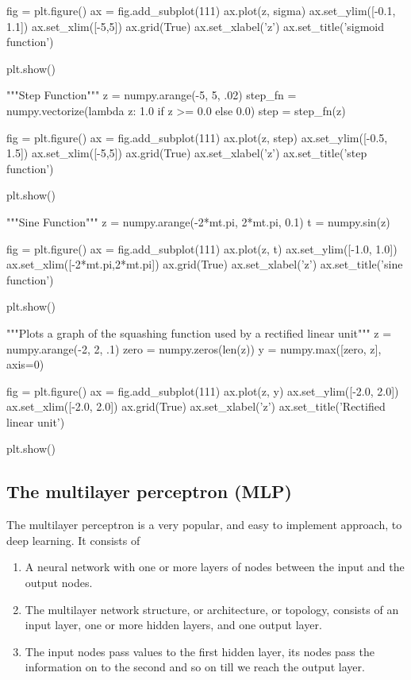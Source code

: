 \documentclass[%
oneside,                 %
final,                   %
10pt]{article}
\begin{document}
fig = plt.figure()
ax = fig.add_subplot(111)
ax.plot(z, sigma)
ax.set_ylim([-0.1, 1.1])
ax.set_xlim([-5,5])
ax.grid(True)
ax.set_xlabel('z')
ax.set_title('sigmoid function')

plt.show()

"""Step Function"""
z = numpy.arange(-5, 5, .02)
step_fn = numpy.vectorize(lambda z: 1.0 if z >= 0.0 else 0.0)
step = step_fn(z)

fig = plt.figure()
ax = fig.add_subplot(111)
ax.plot(z, step)
ax.set_ylim([-0.5, 1.5])
ax.set_xlim([-5,5])
ax.grid(True)
ax.set_xlabel('z')
ax.set_title('step function')

plt.show()

"""Sine Function"""
z = numpy.arange(-2*mt.pi, 2*mt.pi, 0.1)
t = numpy.sin(z)

fig = plt.figure()
ax = fig.add_subplot(111)
ax.plot(z, t)
ax.set_ylim([-1.0, 1.0])
ax.set_xlim([-2*mt.pi,2*mt.pi])
ax.grid(True)
ax.set_xlabel('z')
ax.set_title('sine function')

plt.show()

"""Plots a graph of the squashing function used by a rectified linear
unit"""
z = numpy.arange(-2, 2, .1)
zero = numpy.zeros(len(z))
y = numpy.max([zero, z], axis=0)

fig = plt.figure()
ax = fig.add_subplot(111)
ax.plot(z, y)
ax.set_ylim([-2.0, 2.0])
ax.set_xlim([-2.0, 2.0])
ax.grid(True)
ax.set_xlabel('z')
ax.set_title('Rectified linear unit')

plt.show()

\epycod


\subsection{The multilayer  perceptron (MLP)}

The multilayer perceptron is a very popular, and easy to implement approach, to deep learning. It consists of
\begin{enumerate}
\item A neural network with one or more layers of nodes between the input and the output nodes.

\item The multilayer network structure, or architecture, or topology, consists of an input layer, one or more hidden layers, and one output layer.

\item The input nodes pass values to the first hidden layer, its nodes pass the information on to the second and so on till we reach the output layer.
\end{enumerate}
\end{document}
